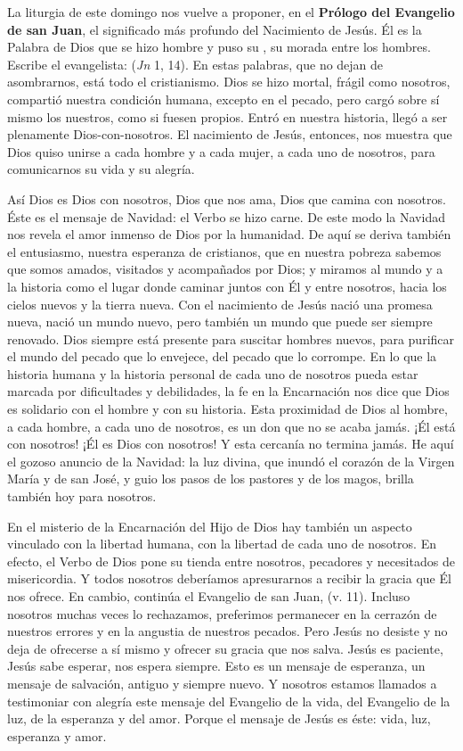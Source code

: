 \begin{body}
\begin{body}
La liturgia de este domingo nos vuelve a proponer, en el \textbf{Prólogo del Evangelio de san Juan}, el significado más profundo del Nacimiento de Jesús. Él es la Palabra de Dios que se hizo hombre y puso su , su morada entre los hombres. Escribe el evangelista:  (\emph{Jn} 1, 14). En estas palabras, que no dejan de asombrarnos, está todo el cristianismo. Dios se hizo mortal, frágil como nosotros, compartió nuestra condición humana, excepto en el pecado, pero cargó sobre sí mismo los nuestros, como si fuesen propios. Entró en nuestra historia, llegó a ser plenamente Dios-con-nosotros. El nacimiento de Jesús, entonces, nos muestra que Dios quiso unirse a cada hombre y a cada mujer, a cada uno de nosotros, para comunicarnos su vida y su alegría.

Así Dios es Dios con nosotros, Dios que nos ama, Dios que camina con nosotros. Éste es el mensaje de Navidad: el Verbo se hizo carne. De este modo la Navidad nos revela el amor inmenso de Dios por la humanidad. De aquí se deriva también el entusiasmo, nuestra esperanza de cristianos, que en nuestra pobreza sabemos que somos amados, visitados y acompañados por Dios; y miramos al mundo y a la historia como el lugar donde caminar juntos con Él y entre nosotros, hacia los cielos nuevos y la tierra nueva. Con el nacimiento de Jesús nació una promesa nueva, nació un mundo nuevo, pero también un mundo que puede ser siempre renovado. Dios siempre está presente para suscitar hombres nuevos, para purificar el mundo del pecado que lo envejece, del pecado que lo corrompe. En lo que la historia humana y la historia personal de cada uno de nosotros pueda estar marcada por dificultades y debilidades, la fe en la Encarnación nos dice que Dios es solidario con el hombre y con su historia. Esta proximidad de Dios al hombre, a cada hombre, a cada uno de nosotros, es un don que no se acaba jamás. ¡Él está con nosotros! ¡Él es Dios con nosotros! Y esta cercanía no termina jamás. He aquí el gozoso anuncio de la Navidad: la luz divina, que inundó el corazón de la Virgen María y de san José, y guio los pasos de los pastores y de los magos, brilla también hoy para nosotros.

En el misterio de la Encarnación del Hijo de Dios hay también un aspecto vinculado con la libertad humana, con la libertad de cada uno de nosotros. En efecto, el Verbo de Dios pone su tienda entre nosotros, pecadores y necesitados de misericordia. Y todos nosotros deberíamos apresurarnos a recibir la gracia que Él nos ofrece. En cambio, continúa el Evangelio de san Juan,  (v. 11). Incluso nosotros muchas veces lo rechazamos, preferimos permanecer en la cerrazón de nuestros errores y en la angustia de nuestros pecados. Pero Jesús no desiste y no deja de ofrecerse a sí mismo y ofrecer su gracia que nos salva. Jesús es paciente, Jesús sabe esperar, nos espera siempre. Esto es un mensaje de esperanza, un mensaje de salvación, antiguo y siempre nuevo. Y nosotros estamos llamados a testimoniar con alegría este mensaje del Evangelio de la vida, del Evangelio de la luz, de la esperanza y del amor. Porque el mensaje de Jesús es éste: vida, luz, esperanza y amor.


\end{body}
\end{body}
